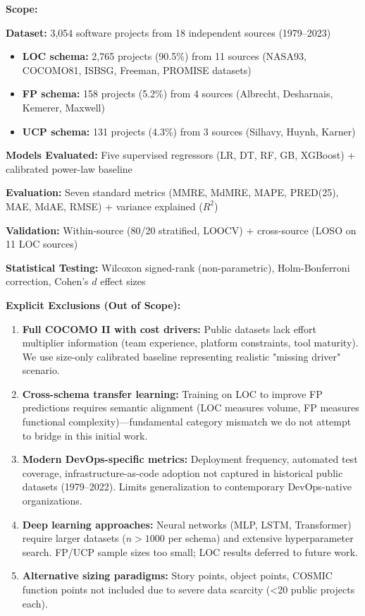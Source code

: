 \documentclass[11pt,a4paper]{article}
\begin{document}
\textbf{Scope:}

\textbf{Dataset:} 3,054 software projects from 18 independent sources (1979--2023)
\begin{itemize}
    \item \textbf{LOC schema:} 2,765 projects (90.5\%) from 11 sources (NASA93, COCOMO81, ISBSG, Freeman, PROMISE datasets)
    \item \textbf{FP schema:} 158 projects (5.2\%) from 4 sources (Albrecht, Desharnais, Kemerer, Maxwell)
    \item \textbf{UCP schema:} 131 projects (4.3\%) from 3 sources (Silhavy, Huynh, Karner)
\end{itemize}

\textbf{Models Evaluated:} Five supervised regressors (LR, DT, RF, GB, XGBoost) + calibrated power-law baseline

\textbf{Evaluation:} Seven standard metrics (MMRE, MdMRE, MAPE, PRED(25), MAE, MdAE, RMSE) + variance explained ($R^2$)

\textbf{Validation:} Within-source (80/20 stratified, LOOCV) + cross-source (LOSO on 11 LOC sources)

\textbf{Statistical Testing:} Wilcoxon signed-rank (non-parametric), Holm-Bonferroni correction, Cohen's $d$ effect sizes

\textbf{Explicit Exclusions (Out of Scope):}

\begin{enumerate}
    \item \textbf{Full COCOMO II with cost drivers:} Public datasets lack effort multiplier information (team experience, platform constraints, tool maturity). We use size-only calibrated baseline representing realistic "missing driver" scenario.
    
    \item \textbf{Cross-schema transfer learning:} Training on LOC to improve FP predictions requires semantic alignment (LOC measures volume, FP measures functional complexity)---fundamental category mismatch we do not attempt to bridge in this initial work.
    
    \item \textbf{Modern DevOps-specific metrics:} Deployment frequency, automated test coverage, infrastructure-as-code adoption not captured in historical public datasets (1979--2022). Limits generalization to contemporary DevOps-native organizations.
    
    \item \textbf{Deep learning approaches:} Neural networks (MLP, LSTM, Transformer) require larger datasets ($n > 1000$ per schema) and extensive hyperparameter search. FP/UCP sample sizes too small; LOC results deferred to future work.
    
    \item \textbf{Alternative sizing paradigms:} Story points, object points, COSMIC function points not included due to severe data scarcity (<20 public projects each).
\end{enumerate}
\end{document}
